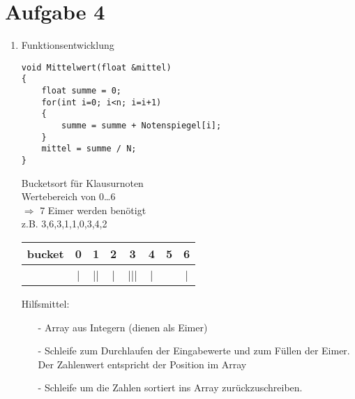 \section{Aufgabe 4}
\begin{enumerate}
\item Funktionsentwicklung
\begin{lstlisting}
void Mittelwert(float &mittel)
{
	float summe = 0;
	for(int i=0; i<n; i=i+1)
	{
		summe = summe + Notenspiegel[i];
	}
	mittel = summe / N;
}
\end{lstlisting}
Bucketsort für Klausurnoten \\
Wertebereich von 0\dots 6 \\
$\Rightarrow$ 7 Eimer werden benötigt \\
z.B. 3,6,3,1,1,0,3,4,2
\begin{table}[h]
\begin{center}
\begin{tabular}{c|c|c|c|c|c|c|c}
bucket & 0 & 1 & 2 & 3 & 4 & 5 & 6\\
\hline
~& | & || & | & ||| & | & ~ & | \\
\end{tabular}
\end{center}
\end{table}
Hilfsmittel:
\begin{itemize}
\item[-] Array aus Integern (dienen als Eimer)
\item[-] Schleife zum Durchlaufen der Eingabewerte und zum Füllen der Eimer. \\
	Der Zahlenwert entspricht der Position im Array
\item[-] Schleife um die Zahlen sortiert ins Array zurückzuschreiben.
\end{itemize}

\end{enumerate}

